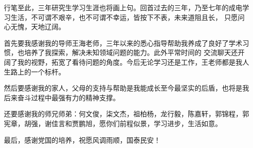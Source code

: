 \thesisacknowledgement

行笔至此，三年研究生学习生涯也将画上句。回首过去的三年，乃至七年的成电学习生活，不可谓不艰辛，也不可谓不幸运，皆按下不表，未来道阻且长，
只愿问心无愧，天地辽阔。

首先要我感谢我的导师王海老师，三年以来的悉心指导帮助我养成了良好了学术习惯，也培养了我探索，解决未知领域问题的能力。此外平常时间的
交流聊天还开阔了我的视野，拓宽了看待问题的角度。今后无论学习还是工作，王老师都是我人生路上的一个标杆。

然后要感谢我的家人，父母的支持与帮助是我能成长至今最坚实的后盾，也将是我后来奋斗过程中最强有力的精神支撑。

还要感谢我的师兄师弟：何文俊，柒文杰，祖柏杨，龙行毅，陈嘉轩，郭锦程，郭宪章，胡强，谢佳言和贾鹏旭，愿你们前程似景，学习进步，生活如意。

最后，感谢党国的培养，祝愿风调雨顺，国泰民安！
